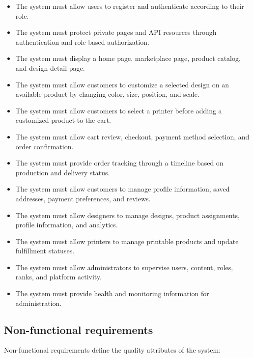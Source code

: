 \begin{itemize}
    \item The system must allow users to register and authenticate according to their role.
    \item The system must protect private pages and API resources through authentication and role-based authorization.
    \item The system must display a home page, marketplace page, product catalog, and design detail page.
    \item The system must allow customers to customize a selected design on an available product by changing color, size, position, and scale.
    \item The system must allow customers to select a printer before adding a customized product to the cart.
    \item The system must allow cart review, checkout, payment method selection, and order confirmation.
    \item The system must provide order tracking through a timeline based on production and delivery status.
    \item The system must allow customers to manage profile information, saved addresses, payment preferences, and reviews.
    \item The system must allow designers to manage designs, product assignments, profile information, and analytics.
    \item The system must allow printers to manage printable products and update fulfillment statuses.
    \item The system must allow administrators to supervise users, content, roles, ranks, and platform activity.
    \item The system must provide health and monitoring information for administration.
\end{itemize}

\subsection{Non-functional requirements}
Non-functional requirements define the quality attributes of the system:

